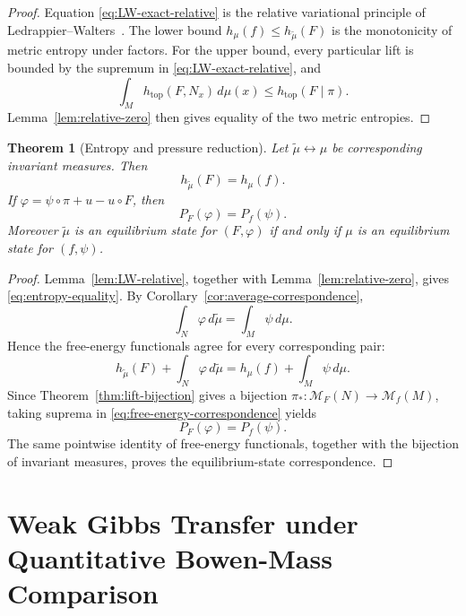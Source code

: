 \documentclass[11pt,a4paper]{article}
\newtheorem{theorem}{Theorem}[section]
\newcommand{\M}{\mathcal M}
\begin{document}
\begin{proof}
Equation \eqref{eq:LW-exact-relative} is the relative variational principle of
Ledrappier--Walters~\cite{LedrappierWalters}. The lower bound
$h_\mu(f)\le h_{\widetilde\mu}(F)$ is the monotonicity of metric entropy under
factors. For the upper bound, every particular lift is bounded by the
supremum in \eqref{eq:LW-exact-relative}, and
\[
\int_M h_{\mathrm{top}}(F,N_x)\,d\mu(x)
\le h_{\mathrm{top}}(F\mid\pi).
\]
Lemma~\ref{lem:relative-zero} then gives equality of the two metric entropies.
\end{proof}

\begin{theorem}[Entropy and pressure reduction]
\label{thm:pressure}
Let $\widetilde\mu\leftrightarrow\mu$ be corresponding invariant measures.
Then
\begin{equation}
\boxed{h_{\widetilde\mu}(F)=h_\mu(f).}
\label{eq:entropy-equality}
\end{equation}
If $\varphi=\psi\circ\pi+u-u\circ F$, then
\begin{equation}
\boxed{P_F(\varphi)=P_f(\psi).}
\label{eq:pressure-equality}
\end{equation}
Moreover $\widetilde\mu$ is an equilibrium state for $(F,\varphi)$ if and
only if $\mu$ is an equilibrium state for $(f,\psi)$.
\end{theorem}

\begin{proof}
Lemma~\ref{lem:LW-relative}, together with
Lemma~\ref{lem:relative-zero}, gives
\eqref{eq:entropy-equality}. By Corollary~\ref{cor:average-correspondence},
\[
\int_N\varphi\,d\widetilde\mu=\int_M\psi\,d\mu.
\]
Hence the free-energy functionals agree for every corresponding pair:
\begin{equation}
h_{\widetilde\mu}(F)+\int_N\varphi\,d\widetilde\mu
=
h_\mu(f)+\int_M\psi\,d\mu.
\label{eq:free-energy-correspondence}
\end{equation}
Since Theorem~\ref{thm:lift-bijection} gives a bijection
$\pi_*:\M_F(N)\to\M_f(M)$, taking suprema in
\eqref{eq:free-energy-correspondence} yields
\[
P_F(\varphi)=P_f(\psi).
\]
The same pointwise identity of free-energy functionals, together with the
bijection of invariant measures, proves the equilibrium-state
correspondence.
\end{proof}

\section{Weak Gibbs Transfer under Quantitative Bowen-Mass Comparison}\label{sec:weak-gibbs}
\end{document}
